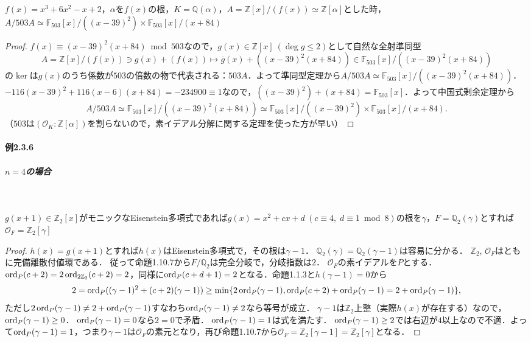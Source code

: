 \begin{screen}
  $f(x)=x^3+6x^2-x+2$，$\alpha$を$f(x)$の根，$K=\mathbb{Q}(\alpha)$，$A=\mathbb{Z}[x]/(f(x))\simeq\mathbb{Z}[\alpha]$とした時，$A/503A\simeq\mathbb{F}_{503}[x]/((x-39)^2)\times\mathbb{F}_{503}[x]/(x+84)$
\end{screen}
\begin{proof}
  $f(x)\equiv(x-39)^2(x+84)\bmod503$なので，$g(x)\in\mathbb{Z}[x]\ (\deg g\leq2)$として自然な全射準同型
  \[A=\mathbb{Z}[x]/(f(x))\ni g(x)+(f(x))\mapsto \overline{g}(x)+((x-39)^2(x+84))\in\mathbb{F}_{503}[x]/((x-39)^2(x+84))\]
  の$\ker$は$g(x)$のうち係数が$503$の倍数の物で代表される：$503A$．よって準同型定理から$A/503A\simeq\mathbb{F}_{503}[x]/((x-39)^2(x+84))$．
  $-116(x-39)^2+116(x-6)(x+84)=-234900\equiv1$なので，$((x-39)^2)+(x+84)=\mathbb{F}_{503}[x]$．よって中国式剰余定理から
  \[A/503A\simeq\mathbb{F}_{503}[x]/((x-39)^2(x+84))\simeq\mathbb{F}_{503}[x]/((x-39)^2)\times\mathbb{F}_{503}[x]/(x+84).\]
  （$503$は$(\mathcal{O}_K:\mathbb{Z}[\alpha])$を割らないので，素イデアル分解に関する定理を使った方が早い）
\end{proof}

\paragraph{例2.3.6}
\subparagraph{$n = 4$の場合}~

\begin{screen}
  $g(x+1)\in\mathbb{Z}_2[x]$がモニックなEisenstein多項式であれば$g(x)=x^2+cx+d\ (c\equiv4, \; d\equiv1\bmod8)$の根を$\gamma$，$F=\mathbb{Q}_2(\gamma)$とすれば$\mathcal{O}_F=\mathbb{Z}_2[\gamma]$
\end{screen}
\begin{proof}
  $h(x)=g(x+1)$とすれば$h(x)$はEisenstein多項式で，その根は$\gamma-1$．
  $\mathbb{Q}_2(\gamma)=\mathbb{Q}_2(\gamma-1)$は容易に分かる．
  $\mathbb{Z}_2$, $\mathcal{O}_F$はともに完備離散付値環である．
  従って命題1.10.7から$F/\mathbb{Q}_2$は完全分岐で，分岐指数は$2$．
  $\mathcal{O}_F$の素イデアルを$P$とする．
  $\operatorname{ord}_P(c+2)=2\operatorname{ord}_{2\mathbb{Z}_2}(c+2)=2$，同様に$\operatorname{ord}_P(c+d+1)=2$となる．命題1.1.3と$h(\gamma-1)=0$から
  \[2=\operatorname{ord}_P((\gamma-1)^2+(c+2)(\gamma-1))\geq\min\{2\operatorname{ord}_P(\gamma-1), \operatorname{ord}_P(c+2)+\operatorname{ord}_P(\gamma-1)=2+\operatorname{ord}_P(\gamma-1)\}, \]
  ただし$2\operatorname{ord}_P(\gamma-1)\neq2+\operatorname{ord}_P(\gamma-1)$すなわち$\operatorname{ord}_P(\gamma-1)\neq2$なら等号が成立．
  $\gamma-1$は$\mathbb{Z}_2$上整（実際$h(x)$が存在する）なので，$\operatorname{ord}_P(\gamma-1)\geq0$．
  $\operatorname{ord}_P(\gamma-1)=0$なら$2=0$で矛盾．
  $\operatorname{ord}_P(\gamma-1)=1$は式を満たす．
  $\operatorname{ord}_P(\gamma-1)\geq2$では右辺が$4$以上なので不適．よって$\operatorname{ord}_P(\gamma-1)=1$，つまり$\gamma-1$は$\mathcal{O}_F$の素元となり，再び命題1.10.7から$\mathcal{O}_F=\mathbb{Z}_2[\gamma-1]=\mathbb{Z}_2[\gamma]$となる．
\end{proof}


